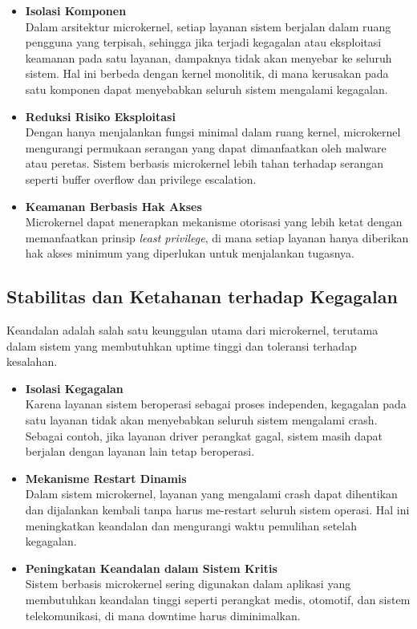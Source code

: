 \begin{itemize}
	\item \textbf{Isolasi Komponen} \\
	Dalam arsitektur microkernel, setiap layanan sistem berjalan dalam ruang pengguna yang terpisah, sehingga jika terjadi kegagalan atau eksploitasi keamanan pada satu layanan, dampaknya tidak akan menyebar ke seluruh sistem. Hal ini berbeda dengan kernel monolitik, di mana kerusakan pada satu komponen dapat menyebabkan seluruh sistem mengalami kegagalan.
	
	\item \textbf{Reduksi Risiko Eksploitasi} \\
	Dengan hanya menjalankan fungsi minimal dalam ruang kernel, microkernel mengurangi permukaan serangan yang dapat dimanfaatkan oleh malware atau peretas. Sistem berbasis microkernel lebih tahan terhadap serangan seperti buffer overflow dan privilege escalation.
	
	\item \textbf{Keamanan Berbasis Hak Akses} \\
	Microkernel dapat menerapkan mekanisme otorisasi yang lebih ketat dengan memanfaatkan prinsip \textit{least privilege}, di mana setiap layanan hanya diberikan hak akses minimum yang diperlukan untuk menjalankan tugasnya.
\end{itemize}

\subsection{Stabilitas dan Ketahanan terhadap Kegagalan}

Keandalan adalah salah satu keunggulan utama dari microkernel, terutama dalam sistem yang membutuhkan uptime tinggi dan toleransi terhadap kesalahan.

\begin{itemize}
	\item \textbf{Isolasi Kegagalan} \\
	Karena layanan sistem beroperasi sebagai proses independen, kegagalan pada satu layanan tidak akan menyebabkan seluruh sistem mengalami crash. Sebagai contoh, jika layanan driver perangkat gagal, sistem masih dapat berjalan dengan layanan lain tetap beroperasi.
	
	\item \textbf{Mekanisme Restart Dinamis} \\
	Dalam sistem microkernel, layanan yang mengalami crash dapat dihentikan dan dijalankan kembali tanpa harus me-restart seluruh sistem operasi. Hal ini meningkatkan keandalan dan mengurangi waktu pemulihan setelah kegagalan.
	
	\item \textbf{Peningkatan Keandalan dalam Sistem Kritis} \\
	Sistem berbasis microkernel sering digunakan dalam aplikasi yang membutuhkan keandalan tinggi seperti perangkat medis, otomotif, dan sistem telekomunikasi, di mana downtime harus diminimalkan.
\end{itemize}



